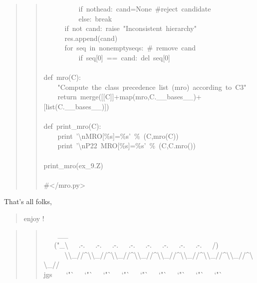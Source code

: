 \documentclass[10pt,a4paper,english]{article}
\begin{document}
\begin{quote}
\begin{quote}
{~~~~~~~~~~if~nothead:~cand=None~{\#}reject~candidate~\\
~~~~~~~~~~else:~break~\\
~~~~~~if~not~cand:~raise~"Inconsistent~hierarchy"~\\
~~~~~~res.append(cand)~\\
~~~~~~for~seq~in~nonemptyseqs:~{\#}~remove~cand~\\
~~~~~~~~~~if~seq{[}0]~==~cand:~del~seq{[}0]~\\
~\\
def~mro(C):~\\
~~~~"Compute~the~class~precedence~list~(mro)~according~to~C3"~\\
~~~~return~merge({[}{[}C]]+map(mro,C.{\_}{\_}bases{\_}{\_})+{[}list(C.{\_}{\_}bases{\_}{\_})])~\\
~\\
def~print{\_}mro(C):~\\
~~~~print~'{\textbackslash}nMRO{[}{\%}s]={\%}s'~{\%}~(C,mro(C))~\\
~~~~print~'{\textbackslash}nP22~MRO{[}{\%}s]={\%}s'~{\%}~(C,C.mro())~\\
~\\
print{\_}mro(ex{\_}9.Z)~\\
~\\
{\#}</mro.py>
}\end{quote}
\end{quote}

That's all folks,
\begin{quote}

enjoy !
\end{quote}


\hspace*{\fill}\hrulefill\hspace*{\fill}

\begin{quote}
\begin{quote}{\ttfamily \raggedright \noindent
~~~~{\_}{\_}~\\
~~~("{\_}{\textbackslash}~~~.-.~~~.-.~~~.-.~~~.-.~~~.-.~~~.-.~~~.-.~~~.-.~~~/)~\\
~~~~~~{\textbackslash}{\textbackslash}{\_}//{\textasciicircum}{\textbackslash}{\textbackslash}{\_}//{\textasciicircum}{\textbackslash}{\textbackslash}{\_}//{\textasciicircum}{\textbackslash}{\textbackslash}{\_}//{\textasciicircum}{\textbackslash}{\textbackslash}{\_}//{\textasciicircum}{\textbackslash}{\textbackslash}{\_}//{\textasciicircum}{\textbackslash}{\textbackslash}{\_}//{\textasciicircum}{\textbackslash}{\textbackslash}{\_}//{\textasciicircum}{\textbackslash}{\textbackslash}{\_}//~\\
jgs~~~~`"`~~~`"`~~~`"`~~~`"`~~~`"`~~~`"`~~~`"`~~~`"`~~~`"`
}\end{quote}
\end{quote}
\end{document}
